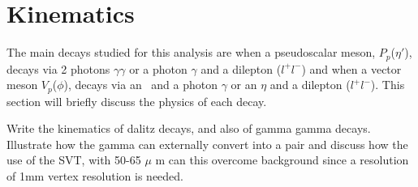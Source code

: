 \section{Kinematics}\label{sec:kinematics}
The main decays studied for this analysis are when a pseudoscalar meson, $P_p$($\eta'$), decays via 2 photons $\gamma \gamma$ or a photon $\gamma$ and a dilepton ($l^{+}l^{-}$) and when a vector meson $V_p$($\phi$), decays via an \etaT \  and a photon $\gamma$ or an $\eta$ and a dilepton ($l^{+}l^{-}$). This section will briefly discuss the physics of each decay.

Write the kinematics of dalitz decays, and also of gamma gamma decays. Illustrate how the gamma can externally convert into a \epemT pair and discuss how the use of the SVT, with 50-65 $\mu$ m can this overcome background since a resolution of 1mm vertex resolution is needed.